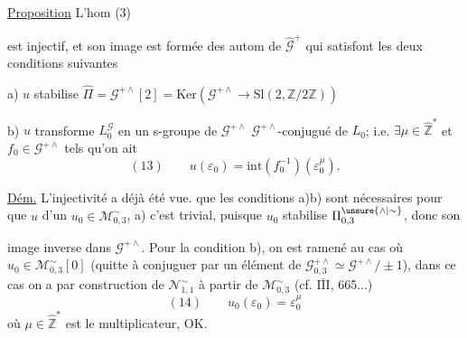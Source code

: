 \uline{Proposition} L'hom (3)


est injectif, et son image est formée des
autom de $\widehat{\mathcal{G}}^{+}$ qui satisfont les deux
conditions suivantes

a) $u$ stabilise $\widehat{\Pi}=\mathcal{G}^{+\wedge}[2]
=\mathrm{Ker}(\mathcal{G}^{+\wedge}\longrightarrow\mathrm{Sl}(2,\mathbb{Z}/2\mathbb{Z}))$

b) $u$ transforme $L_{0}^{\mathcal{G}}$ en un s-groupe de $\mathcal{G}^{+\wedge}$
$\mathcal{G}^{+\wedge}$-conjugué de $L_{0}$; i.e.
$\exists\mu\in\widehat{\mathbb{Z}}^{*}$ et $f_{0}\in\mathcal{G}^{+\wedge}$
tels qu'on ait
\[
(13)\qquad u(\varepsilon_{0})=\mathrm{int}(f_{0}^{-1})(\varepsilon_{0}^{\mu}).
\]

\uline{Dém.} L'injectivité a déjà été vue.
que les conditions a)b) sont nécessaires pour
que $u$ 
d'un $u_{0}\in\mathcal{M}_{0,3}^{\sim}$,
 a) c'est trivial, puisque $u_{0}$ stabilise
$\Pi_{0,3}^{\unsure{\wedge|\sim}}$, donc son




image inverse dans $\mathcal{G}^{+\wedge}$. Pour la condition
b), on est ramené au cas où $u_{0}\in\mathcal{M}_{0,3}^{\sim}[0]$
(quitte à conjuguer par un élément de
$\mathcal{G}_{0,3}^{+\wedge}\simeq\mathcal{G}^{+\wedge}/\!\pm1$),
dans ce cas on a par construction de $\mathcal{N}_{1,1}^{\sim}$ à partir
de $\mathcal{M}_{0,3}^{\sim}$ (cf. \uline{\(\overline{\mathrm{III}}\)},  665...)
\[
(14)\qquad u_{0}(\varepsilon_{0})=\varepsilon_{0}^{\mu}
\]
où $\mu\in\widehat{\mathbb{Z}}^{*}$ est le multiplicateur, OK.


